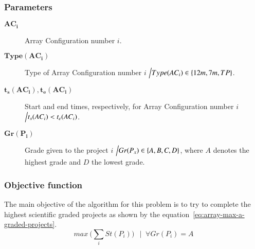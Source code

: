 \subsubsection{Parameters}
\begin{description}
\item[$\mathbf{AC_i}$] Array Configuration number $i$.

\item[$\mathbf{Type(AC_i)}$] Type of Array Configuration number $i$ $\Big\slash Type(AC_i) \in \{12m, 7m, TP\}$.

\item[$\mathbf{t_s(AC_i), t_e(AC_i)}$] Start and end times, respectively, for Array Configuration number $i$ $\Big\slash t_s(AC_i) < t_e(AC_i)$.

\item[$\mathbf{Gr(P_i)}$] Grade given to the project $i$ $\Big\slash Gr(P_x) \in \{A,B,C,D\}$, where $A$ denotes the highest grade and $D$ the lowest grade.
\end{description}

\subsubsection{Objective function}
The main objective of the algorithm for this problem is to try to complete the highest scientific graded projects as shown by the equation~\ref{eq:array-max-a-graded-projects}.
\begin{equation}
\label{eq:array-max-a-graded-projects}
max \: \bigg(\sum_{i} St(P_i)\bigg) \:\: \mid\; \forall Gr(P_i) = A
\end{equation}


